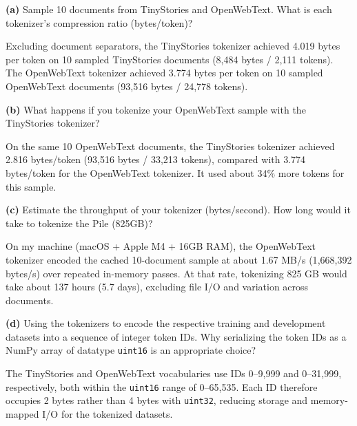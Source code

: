 \textbf{(a)} Sample 10 documents from TinyStories and OpenWebText. What is each tokenizer's compression ratio (bytes/token)?


Excluding document separators, the TinyStories tokenizer achieved 4.019 bytes per token on 10 sampled TinyStories documents (8{,}484 bytes / 2{,}111 tokens). The OpenWebText tokenizer achieved 3.774 bytes per token on 10 sampled OpenWebText documents (93{,}516 bytes / 24{,}778 tokens).

\textbf{(b)} What happens if you tokenize your OpenWebText sample with the TinyStories tokenizer?


On the same 10 OpenWebText documents, the TinyStories tokenizer achieved 2.816 bytes/token (93{,}516 bytes / 33{,}213 tokens), compared with 3.774 bytes/token for the OpenWebText tokenizer. It used about 34\% more tokens for this sample.

\textbf{(c)} Estimate the throughput of your tokenizer (bytes/second). How long would it take to tokenize the Pile (825GB)?


On my machine (macOS + Apple M4 + 16GB RAM), the OpenWebText tokenizer encoded the cached 10-document sample at about 1.67 MB/s (1{,}668{,}392 bytes/s) over repeated in-memory passes. 
At that rate, tokenizing 825 GB would take about 137 hours (5.7 days), excluding file I/O and variation across documents.

\textbf{(d)} Using the tokenizers to encode the respective training and 
development datasets into a sequence of integer token IDs. Why serializing the token IDs as a NumPy array of 
datatype \texttt{uint16} is an appropriate choice?


The TinyStories and OpenWebText vocabularies use IDs 0--9{,}999 and 0--31{,}999, respectively, 
both within the \texttt{uint16} range of 0--65{,}535. Each ID therefore occupies 2 bytes rather than 4 bytes with \texttt{uint32}, 
reducing storage and memory-mapped I/O for the tokenized datasets.
